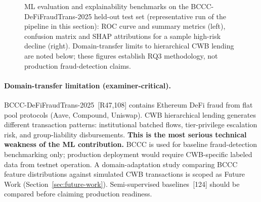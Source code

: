 \documentclass[12pt,a4paper]{report}
\begin{document}
\begin{figure}[H]
\begin{minipage}[t]{0.48\linewidth}
\vspace{4pt}
\end{minipage}
\caption[ML evaluation and explainability benchmarks]{ML evaluation and explainability benchmarks on the BCCC-DeFiFraudTrans-2025 held-out test set (representative run of the pipeline in this section): ROC curve and summary metrics (left), confusion matrix and SHAP attributions for a sample high-risk decline (right). Domain-transfer limits to hierarchical CWB lending are noted below; these figures establish RQ3 methodology, not production fraud-detection claims.}
\label{fig:ml-eval}
\end{figure}

\paragraph{Domain-transfer limitation (examiner-critical).}
BCCC-DeFiFraudTrans-2025~[R47,108] contains Ethereum DeFi fraud from flat pool protocols (Aave, Compound, Uniswap). CWB hierarchical lending generates different transaction patterns: institutional batched flows, tier-privilege escalation risk, and group-liability disbursements. \textbf{This is the most serious technical weakness of the ML contribution.} BCCC is used for baseline fraud-detection benchmarking only; production deployment would require CWB-specific labeled data from testnet operation. A domain-adaptation study comparing BCCC feature distributions against simulated CWB transactions is scoped as Future Work (Section~\ref{sec:future-work}). Semi-supervised baselines~[124] should be compared before claiming production readiness.
\end{document}
